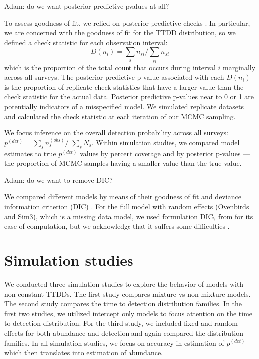 \documentclass[useAMS,usenatbib,referee,12pt]{article}
\newcommand{\jarad}[1]{{\color{Orange} #1}}
\newcommand{\pdet}{p^{(det)}}
\begin{document}
\jarad{Adam: do we want posterior predictive pvalues at all?}

To assess goodness of fit, we relied on posterior predictive checks \citep{Gelman1996}.  
In particular, we are concerned with the goodness of fit for the TTDD distribution, so we defined a check statistic for each observation interval:
\[D(n_i) = \sum\limits_{s} n_{si} \big/ \sum\limits_{si} n_{si}\]
which is the proportion of the total count that occurs during interval $i$ marginally across all surveys.  
The posterior predictive p-value associated with each $D(n_i)$ is the proportion of replicate check statistics that have a larger value than the check statistic for the actual data.  
Posterior predictive p-values near to 0 or 1 are potentially indicators of a misspecified model.
We simulated replicate datasets and calculated the check statistic at each iteration of our MCMC sampling.  

We focus inference on the overall detection probability across all surveys: $\pdet = \sum\limits_{s}n_{s}^{(obs)}\big/$ $\sum\limits_{s}N_{s}$.  
Within simulation studies, we compared model estimates to true $\pdet$ values by percent coverage and by posterior p-values --- the proportion of MCMC samples having a smaller value than the true value.  

\jarad{Adam: do we want to remove DIC?}

We compared different models by means of their goodness of fit and deviance information criterion (DIC) \citep{Spiegelhalter2002}.  
For the full model with random effects (Ovenbirds and Sim3), which is a missing data model, we used formulation DIC$_7$ from \citet{Celeux2006} for its ease of computation, but we acknowledge that it suffers some difficulties \citep{Celeux2006, Li2014}.





\section{Simulation studies} \label{sec:sim}

We conducted three simulation studies to explore the behavior of models with non-constant TTDDs.
The first study compares mixture vs non-mixture models.
The second study compares the time to detection distribution families.
In the first two studies, we utilized intercept only models to focus attention on the time to detection distribution. 
For the third study, we included fixed and random effects for both abundance and detection and again compared the distribution families. 
In all simulation studies, we focus on accuracy in estimation of $\pdet$ which then translates into estimation of abundance. 
\end{document}
